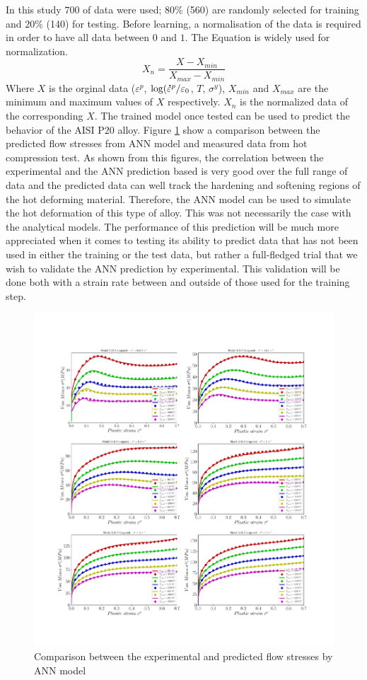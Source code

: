 \documentclass[twoside,english,1p,final,sort&compress]{elsarticle}
\theoremstyle{plain}
\newcommand{\mdot}[1]{\accentset{\mbox{\bfseries .}}{#1}}
\begin{document}
In this study $700$ of data were used; $80\%$ (560) are randomly selected for training and $20\%$ (140) for testing. Before learning, a normalisation of the data is required in order to have all data between $0$ and $1$. The Equation is widely used for normalization.
\begin{equation}
X_n = \frac{X - X_{min}}{X_{max} - X_{min}}
\end{equation}
Where $X$ is the orginal data ($\varepsilon^p$, $\log(\mdot{\varepsilon}^p/\varepsilon_0$,  $T$, $\sigma^y$), $X_{min}$ and $X_{max}$ are the minimum and maximum values of $X$ respectively. $X_n$ is the normalized data of the corresponding $X$. The trained model once tested can be used to predict the behavior of the AISI P20 alloy. Figure \ref{fig:iCorrelationANN} show a comparison between the predicted ﬂow stresses from ANN model and measured data from hot compression test. As shown from this figures, the correlation between the experimental and the ANN prediction based is very good over the full range of data and the predicted data can well track the hardening and softening regions of the hot deforming material. Therefore, the ANN model can be used to simulate the hot deformation of this type of alloy. This was not necessarily the case with the analytical models. The performance of this prediction will be much more appreciated when it comes to testing its ability to predict data that has not been used in either the training or the test data, but rather a full-fledged trial that we wish to validate the ANN prediction by experimental. This validation will be done both with a strain rate between and outside of those used for the training step.
\begin{figure}[!ht]
\centering
\includegraphics[width=1\columnwidth]
{newFigures/CompExpANN}
\caption{Comparison between the experimental and predicted flow stresses by ANN model }
\label{fig:iCorrelationANN}
\end{figure}
\end{document}
